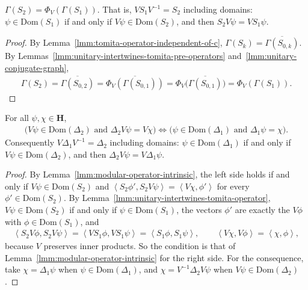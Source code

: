 \begin{lemma}
    \label{lmm:unitary-intertwines-tomita-operator}
    \leanok
    $\Gamma(S_2) = \Phi_V(\Gamma(S_1))$. That is, $VS_1V^{-1} = S_2$ including domains: $\psi \in \text{Dom}(S_1)$ if and only if $V\psi \in \text{Dom}(S_2)$, and then $S_2V\psi = VS_1\psi$.
\end{lemma}
\begin{proof}
    \leanok
    By Lemma~\ref{lmm:tomita-operator-independent-of-c}, $\Gamma(S_k) = \overline{\Gamma(S_{0,k})}$. By Lemmas~\ref{lmm:unitary-intertwines-tomita-pre-operators} and~\ref{lmm:unitary-conjugate-graph},
    \begin{align}
        \Gamma(S_2) = \overline{\Gamma(S_{0,2})} = \overline{\Phi_V(\Gamma(S_{0,1}))} = \Phi_V\big(\overline{\Gamma(S_{0,1})}\big) = \Phi_V(\Gamma(S_1)).
    \end{align}
\end{proof}

\begin{lemma}
    \label{lmm:unitary-intertwines-modular-operator}
    \leanok
    For all $\psi, \chi \in \mathbf{H}$,
    \begin{align}
        \big( V\psi \in \text{Dom}(\Delta_2) \text{ and } \Delta_2V\psi = V\chi \big) \iff \big( \psi \in \text{Dom}(\Delta_1) \text{ and } \Delta_1\psi = \chi \big).
    \end{align}
    Consequently $V\Delta_1V^{-1} = \Delta_2$ including domains: $\psi \in \text{Dom}(\Delta_1)$ if and only if $V\psi \in \text{Dom}(\Delta_2)$, and then $\Delta_2V\psi = V\Delta_1\psi$.
\end{lemma}
\begin{proof}
    \leanok
    By Lemma~\ref{lmm:modular-operator-intrinsic}, the left side holds if and only if $V\psi \in \text{Dom}(S_2)$ and $\left< S_2\phi', S_2V\psi \right> = \left< V\chi, \phi' \right>$ for every $\phi' \in \text{Dom}(S_2)$. By Lemma~\ref{lmm:unitary-intertwines-tomita-operator}, $V\psi \in \text{Dom}(S_2)$ if and only if $\psi \in \text{Dom}(S_1)$, the vectors $\phi'$ are exactly the $V\phi$ with $\phi \in \text{Dom}(S_1)$, and
    \begin{align}
        \left< S_2V\phi, S_2V\psi \right> = \left< VS_1\phi, VS_1\psi \right> = \left< S_1\phi, S_1\psi \right>, \qquad \left< V\chi, V\phi \right> = \left< \chi, \phi \right>,
    \end{align}
    because $V$ preserves inner products. So the condition is that of Lemma~\ref{lmm:modular-operator-intrinsic} for the right side. For the consequence, take $\chi = \Delta_1\psi$ when $\psi \in \text{Dom}(\Delta_1)$, and $\chi = V^{-1}\Delta_2V\psi$ when $V\psi \in \text{Dom}(\Delta_2)$.
\end{proof}


